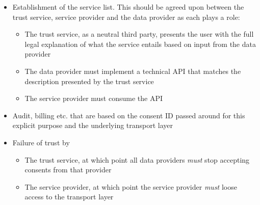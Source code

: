 \documentclass[nobib]{tufte-handout}
\begin{document}
\begin{itemize}
	\item Establishment of the service list. This should be agreed upon between the trust service, service provider and the data provider as each plays a role: 
	\begin{itemize}
		\item The trust service, as a neutral third party, presents the user with the full legal explanation of what the service entails based on input from the data provider
		\item The data provider must implement a technical API that matches the description presented by the trust service
		\item The service provider must consume the API
	\end{itemize}
	\item Audit, billing etc. that are based on the consent ID passed around for this explicit purpose and the underlying transport layer
	\item Failure of trust by 
	\begin{itemize}
		\item The trust service, at which point all data providers \emph{must} stop accepting consents from that provider
		\item The service provider, at which point the service provider \emph{must} loose access to the transport layer  
	\end{itemize}
\end{itemize}
\end{document}
